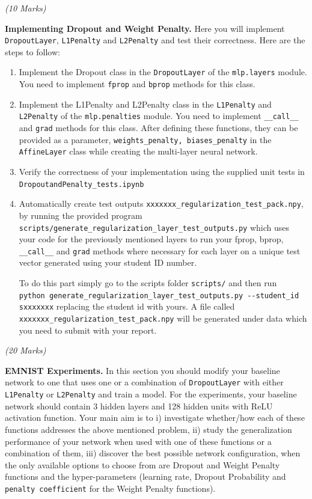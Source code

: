 \documentclass[11pt,]{article}
\begin{document}
\emph{(10 Marks)}
\vspace{0.2cm}

\textbf{Implementing Dropout and Weight Penalty.}
Here you will implement \texttt{DropoutLayer}, \texttt{L1Penalty} and \texttt{L2Penalty} and test their correctness.  
Here are the steps to follow:
\begin{enumerate}
    \item Implement the Dropout class in the \texttt{DropoutLayer} of the \verb+mlp.layers+ module. You need to implement \texttt{fprop} and \texttt{bprop} methods for this class.
    \item Implement the L1Penalty and L2Penalty class in the \texttt{L1Penalty} and \texttt{L2Penalty} of the \verb+mlp.penalties+ module. You need to implement \texttt{\_\_call\_\_} and \texttt{grad} methods for this class. 
    After defining these functions, they can be provided as a parameter, \texttt{weights\_penalty, biases\_penalty} in the \texttt{AffineLayer} class while creating the multi-layer neural network. 
    \item Verify the correctness of your implementation using the supplied unit tests in \\ \texttt{DropoutandPenalty\_tests.ipynb} 
    \item Automatically  create  test outputs  \texttt{xxxxxxx\_regularization\_test\_pack.npy},   by  running  the  provided  program 
    \texttt{scripts/generate\_regularization\_layer\_test\_outputs.py} which uses your code for the previously mentioned layers to run your fprop, bprop, \texttt{\_\_call\_\_} and \texttt{grad} methods where necessary for each layer on a unique test vector generated using your student 
    ID number.
    
    To do this part simply go to the scripts folder \texttt{scripts/} and then run \\ \texttt{python generate\_regularization\_layer\_test\_outputs.py -{}-student\_id sxxxxxxx} replacing the student id with yours. A file called \texttt{xxxxxxx\_regularization\_test\_pack.npy} will be generated under data which you need to submit with your report.
\end{enumerate}

\emph{(20 Marks)}
\vspace{0.2cm}

\textbf{EMNIST Experiments.}
In this section you should modify your baseline network to one that uses one or a combination of \texttt{DropoutLayer} with either \texttt{L1Penalty} or \texttt{L2Penalty} and train a model. 
For the experiments, your baseline network should contain 3 hidden layers and 128 hidden units with ReLU activation function.
Your main aim is to i) investigate whether/how each of these functions addresses the above mentioned problem, ii)
study the generalization performance of your network when used with one of these functions or a combination of them, iii) discover the best possible network configuration, when the only available options to choose from are Dropout and Weight Penalty functions and the hyper-parameters (learning rate, Dropout Probability and \texttt{penalty coefficient} for the Weight Penalty functions). 
\end{document}
